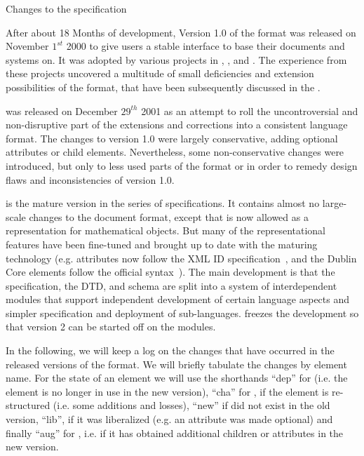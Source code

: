 
\begin{tchapter}[id=changelog]{Changes to the specification}

After about 18 Months of development, Version 1.0 of the {\omdoc} format was released on
November $1^{st}$ 2000 to give users a stable interface to base their documents and
systems on. It was adopted by various projects in {},
{}, and {}. The
experience from these projects uncovered a multitude of small deficiencies and extension
possibilities of the format, that have been subsequently discussed in the {\omdoc}
{}.

{} was released on December $29^{th}$ 2001 as an attempt to roll the
uncontroversial and non-disruptive part of the extensions and corrections into a
consistent language format. The changes to version 1.0 were largely conservative,
adding optional attributes or child elements. Nevertheless, some non-conservative
changes were introduced, but only to less used parts of the format or in order to
remedy design flaws and inconsistencies of version 1.0.

{} is the mature version in the {} series of specifications. It
contains almost no large-scale changes to the document format, except that {\cmathml} is
now allowed as a representation for mathematical objects. But many of the representational
features have been fine-tuned and brought up to date with the maturing {\xml} technology
(e.g. {} attributes now follow the XML ID
specification~\cite{XML:id05}, and the Dublin Core elements follow the official
syntax~\cite{DCMI:dmt03}). The main development is that the {\omdoc} specification, the
DTD, and schema are split into a system of interdependent modules that support independent
development of certain language aspects and simpler specification and deployment of
sub-languages.  {} freezes the development so that version 2 can be started
off on the modules.

In the following, we will keep a log on the changes that have occurred in the
released versions of the {\omdoc} format.  We will briefly tabulate the changes by
element name. For the state of an element we will use the shorthands ``dep'' for
{} (i.e. the element is no longer in use in the new {\omdoc}
version), ``cha'' for {}, if the element is re-structured (i.e.
some additions and losses), ``new'' if did not exist in the old {\omdoc} version,
``lib'', if it was liberalized (e.g. an attribute was made optional) and finally
``aug'' for {}, i.e. if it has obtained additional children or
attributes in the new {\omdoc} version.


\end{tchapter}
